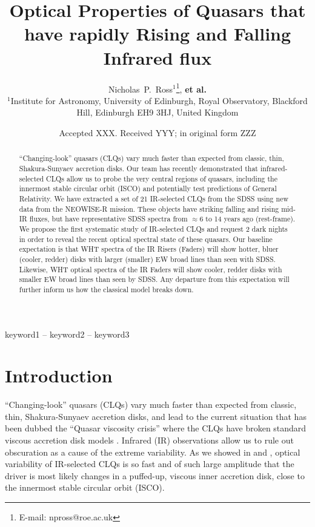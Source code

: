 \documentclass[a4paper,fleqn,usenatbib]{mnras}
\title[Infrared CLQs from WHT]
{Optical Properties of Quasars that have rapidly Rising and Falling Infrared flux}
\author[Bercow]
{%
Nicholas~P.~Ross$^{1}$\thanks{E-mail: npross@roe.ac.uk},   
{\bf et  al.}
\\
$^{1}$Institute for Astronomy, University of Edinburgh, Royal Observatory, Blackford Hill, Edinburgh EH9 3HJ, United Kingdom \\
}
\date{Accepted XXX. Received YYY; in original form ZZZ}
\begin{document}
\label{firstpage}
\pagerange{\pageref{firstpage}--\pageref{lastpage}}
\maketitle

\begin{abstract}
``Changing-look'' quasars (CLQs) vary much faster than expected from
classic, thin, Shakura-Sunyaev accretion disks. Our team has recently
demonstrated that infrared-selected CLQs allow us to probe the very
central regions of quasars, including the innermost stable circular
orbit (ISCO) and potentially test predictions of General
Relativity. We have extracted a set of 21 IR-selected CLQs from the
SDSS using new data from the NEOWISE-R mission. These objects have
striking falling and rising mid-IR fluxes, but have representative
SDSS spectra from $\approx$6 to 14 years ago (rest-frame).  We propose
the first systematic study of IR-selected CLQs and request 2 dark
nights in order to reveal the recent optical spectral state of these
quasars. Our baseline expectation is that WHT spectra of the IR Risers
(Faders) will show hotter, bluer (cooler, redder) disks with larger
(smaller) EW broad lines than seen with SDSS. Likewise, WHT optical
spectra of the IR Faders will show cooler, redder disks with smaller
EW broad lines than seen by SDSS. Any departure from this expectation
will further inform us how the classical model breaks down.
\end{abstract}

\begin{keywords}
keyword1 -- keyword2 -- keyword3
\end{keywords}




\section{Introduction}
``Changing-look'' quasars (CLQs) vary much faster than expected from
classic, thin, Shakura-Sunyaev accretion disks, and lead to the
current situation that has been dubbed the ``Quasar viscosity crisis''
where the CLQs have broken standard viscous accretion disk models
\citep[e.g.][]{Lawrence2018, Antonucci2018}. Infrared (IR)
observations allow us to rule out obscuration as a cause of the
extreme variability. As we showed in \citet{Ross2018} and
\citet{Stern2018}, optical variability of IR-selected CLQs is so fast
and of such large amplitude that the driver is most likely changes in
a puffed-up, viscous inner accretion disk, close to the innermost
stable circular orbit (ISCO).
\end{document}
